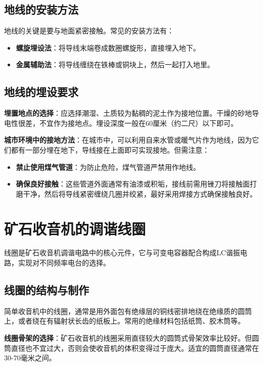 \documentclass[12pt,UTF8]{ctexbook}
\begin{document}
\section{地线的安装方法}

地线的关键是要与地面紧密接触。常见的安装方法有：

\begin{itemize}
	\item \textbf{螺旋埋设法}：将导线末端卷成数圈螺旋形，直接埋入地下。
	\item \textbf{金属辅助法}：将导线缠绕在铁棒或铜块上，然后一起打入地里。
\end{itemize}

\section{地线的埋设要求}

\textbf{埋置地点的选择}：应选择潮湿、土质较为黏稠的泥土作为接地位置。干燥的砂地导电性很差，不宜作为接地点。埋设深度一般在60厘米（约二尺）以下即可。

\textbf{城市环境中的接地方法}：在城市中，可以利用自来水管或暖气片作为地线，因为它们都有一部分埋在地下，导线接在上面即可实现接地。但需注意：
\begin{itemize}
	\item \textbf{禁止使用煤气管道}：为防止危险，煤气管道严禁用作地线。
	\item \textbf{确保良好接触}：这些管道外面通常有油漆或积垢，接线前需用锉刀将接触面打磨干净，然后将导线紧密缠绕几圈并绞紧，最好采用焊接方式确保接触良好。
\end{itemize}

\chapter{矿石收音机的调谐线圈}

线圈是矿石收音机调谐电路中的核心元件，它与可变电容器配合构成LC谐振电路，实现对不同频率电台的选择。

\section{线圈的结构与制作}

简单收音机中的线圈，通常是用外面包有绝缘层的铜线密排地绕在绝缘质的圆筒上，或者绕在有辐射状长齿的纸板上。常用的绝缘材料包括纸筒、胶木筒等。

\textbf{线圈骨架的选择}：矿石收音机的线圈采用直径较大的圆筒式骨架效率比较好。但圆筒直径也不宜过大，否则会使收音机的体积变得过于庞大。适宜的圆筒直径通常在30-70毫米之间。
\end{document}
